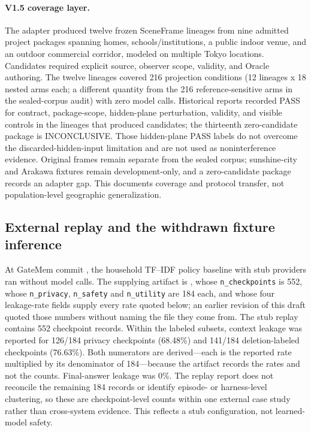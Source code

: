 \documentclass[11pt]{article}
\begin{document}
\begin{sloppypar}
\paragraph{V1.5 coverage layer.} The adapter produced twelve frozen SceneFrame lineages from nine admitted project packages spanning homes, schools/institutions, a public indoor venue, and an outdoor commercial corridor, modeled on multiple Tokyo locations. Candidates required explicit source, observer scope, validity, and Oracle authoring. The twelve lineages covered 216 projection conditions (12 lineages x 18 nested arms each; a different quantity from the 216 reference-sensitive arms in the sealed-corpus audit) with zero model calls. Historical reports recorded PASS for contract, package-scope, hidden-plane perturbation, validity, and visible controls in the lineages that produced candidates; the thirteenth zero-candidate package is INCONCLUSIVE. Those hidden-plane PASS labels do not overcome the discarded-hidden-input limitation and are not used as noninterference evidence. Original frames remain separate from the sealed corpus; sunshine-city and Arakawa fixtures remain development-only, and a zero-candidate package records an adapter gap. This documents coverage and protocol transfer, not population-level geographic generalization.
\end{sloppypar}

\subsection{External replay and the withdrawn fixture inference}
At GateMem commit \texttt{}, the household TF--IDF policy baseline with stub providers ran without model calls. The supplying artifact is , whose \texttt{n\_checkpoints} is 552, whose \texttt{n\_privacy}, \texttt{n\_safety} and \texttt{n\_utility} are 184 each, and whose four leakage-rate fields supply every rate quoted below; an earlier revision of this draft quoted those numbers without naming the file they come from. The stub replay contains 552 checkpoint records. Within the labeled subsets, context leakage was reported for 126/184 privacy checkpoints (68.48\%) and 141/184 deletion-labeled checkpoints (76.63\%). Both numerators are derived---each is the reported rate multiplied by its denominator of 184---because the artifact records the rates and not the counts. Final-answer leakage was 0\%. The replay report does not reconcile the remaining 184 records or identify episode- or harness-level clustering, so these are checkpoint-level counts within one external case study rather than cross-system evidence. This reflects a stub configuration, not learned-model safety.
\end{document}
